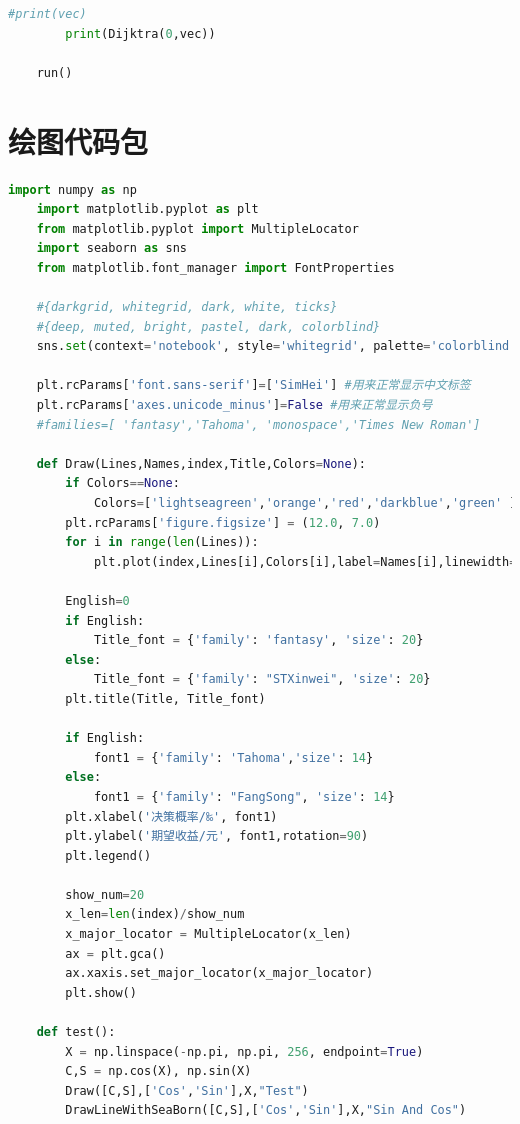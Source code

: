 \documentclass[withoutpreface,bwprint]{cumcmthesis} %
\begin{document}
\begin{appendices}
\begin{lstlisting}[language=python]
        #print(vec)
        print(Dijktra(0,vec))
    
    run()
\end{lstlisting}

\section{绘图代码包}
\begin{lstlisting}[language=python]
    import numpy as np
    import matplotlib.pyplot as plt
    from matplotlib.pyplot import MultipleLocator
    import seaborn as sns
    from matplotlib.font_manager import FontProperties
    
    #{darkgrid, whitegrid, dark, white, ticks}
    #{deep, muted, bright, pastel, dark, colorblind}
    sns.set(context='notebook', style='whitegrid', palette='colorblind', font='sans-serif', font_scale=1, color_codes=False, rc=None)
    
    plt.rcParams['font.sans-serif']=['SimHei'] #用来正常显示中文标签
    plt.rcParams['axes.unicode_minus']=False #用来正常显示负号
    #families=[ 'fantasy','Tahoma', 'monospace','Times New Roman']
    
    def Draw(Lines,Names,index,Title,Colors=None):
        if Colors==None:
            Colors=['lightseagreen','orange','red','darkblue','green' ]
        plt.rcParams['figure.figsize'] = (12.0, 7.0)
        for i in range(len(Lines)):
            plt.plot(index,Lines[i],Colors[i],label=Names[i],linewidth=0.8)
    
        English=0
        if English:
            Title_font = {'family': 'fantasy', 'size': 20}
        else:
            Title_font = {'family': "STXinwei", 'size': 20}
        plt.title(Title, Title_font)
    
        if English:
            font1 = {'family': 'Tahoma','size': 14}
        else:
            font1 = {'family': "FangSong", 'size': 14}
        plt.xlabel('决策概率/‰', font1)
        plt.ylabel('期望收益/元', font1,rotation=90)
        plt.legend()
    
        show_num=20
        x_len=len(index)/show_num
        x_major_locator = MultipleLocator(x_len)
        ax = plt.gca()
        ax.xaxis.set_major_locator(x_major_locator)
        plt.show()
    
    def test():
        X = np.linspace(-np.pi, np.pi, 256, endpoint=True)
        C,S = np.cos(X), np.sin(X)
        Draw([C,S],['Cos','Sin'],X,"Test")
        DrawLineWithSeaBorn([C,S],['Cos','Sin'],X,"Sin And Cos")
    

\end{lstlisting}
\end{appendices}
\end{document}
